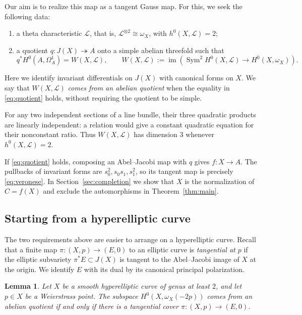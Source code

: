 \documentclass[11pt]{amsart}
\newtheorem{lemma}{Lemma}[section]
\theoremstyle{remark}
\DeclareMathOperator{\Sym}{Sym}
\DeclareMathOperator{\im}{im}
\newcommand{\LL}{\mathcal L}
\numberwithin{equation}{section}
\begin{document}
Our aim is to realize this map as a tangent Gauss map. For this, we seek
the following data:
\begin{enumerate}[label=\arabic*.,leftmargin=*]
\item a theta characteristic $\LL$, that is,
$\LL^{\otimes2}\cong\omega_X$, with $h^0(X,\LL)=2$;
\item a quotient $q:J(X)\twoheadrightarrow A$ onto a simple abelian
threefold such that
\begin{equation}\label{eq:quotient}
q^*H^0(A,\Omega_A^1)=W(X,\LL),\qquad
W(X,\LL):=\im\!\left(
\Sym^2H^0(X,\LL)\longrightarrow H^0(X,\omega_X)\right).
\end{equation}
\end{enumerate}
Here we identify invariant differentials on $J(X)$ with canonical forms
on $X$. We say that $W(X,\LL)$ \emph{comes from an abelian quotient}
when the equality in \eqref{eq:quotient} holds, without requiring the
quotient to be simple.

For any two independent sections of a line bundle, their three quadratic
products are linearly independent: a relation would give a constant
quadratic equation for their nonconstant ratio. Thus $W(X,\LL)$ has
dimension $3$ whenever $h^0(X,\LL)=2$.

If \eqref{eq:quotient} holds, composing an Abel--Jacobi map with $q$ gives
$f:X\to A$. The pullbacks of invariant forms are $s_0^2,s_0s_1,s_1^2$,
so its tangent map is precisely \eqref{eq:veronese}. In Section~\ref{sec:completion}
we show that $X$ is the normalization of $C=f(X)$ and exclude the
automorphisms in Theorem~\ref{thm:main}.

\subsection{Starting from a hyperelliptic curve}
The two requirements above are easier to arrange on a hyperelliptic
curve. Recall that a finite map $\pi:(X,p)\to(E,0)$ to an elliptic curve
is \emph{tangential at $p$} if the elliptic subvariety
$\pi^*E\subset J(X)$ is tangent to the Abel--Jacobi image of $X$ at the
origin. We identify $E$ with its dual by its canonical principal
polarization.

\begin{lemma}\label{lem:tangency}
Let $X$ be a smooth hyperelliptic curve of genus at least $2$, and let
$p\in X$ be a Weierstrass point. The subspace
$H^0(X,\omega_X(-2p))$ comes from an abelian quotient if and only if
there is a tangential cover $\pi:(X,p)\to(E,0)$.
\end{lemma}
\end{document}
